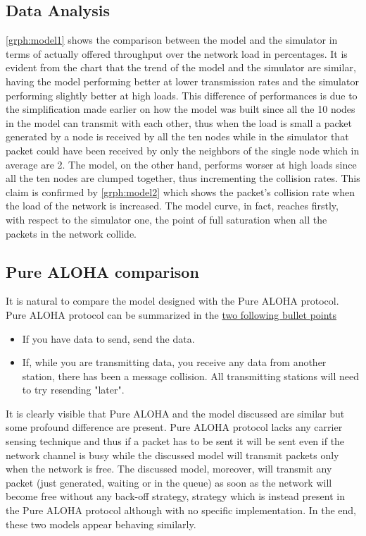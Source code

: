 \documentclass[conference]{IEEEtran}
\begin{document}
\subsection{Data Analysis}\label{sec:dataanalysismodel}
\cref{grph:model1} shows the comparison between the model and the simulator in terms of actually offered throughput over the network load in percentages. It is evident from the chart that the trend of the model and the simulator are similar, having the model performing better at lower transmission rates and the simulator performing slightly better at high loads. This difference of performances is due to the simplification made earlier on how the model was built since all the 10 nodes in the model can transmit with each other, thus when the load is small a packet generated by a node is received by all the ten nodes while in the simulator that packet could have been received by only the neighbors of the single node which in average are 2. The model, on the other hand, performs worser at high loads since all the ten nodes are clumped together, thus incrementing the collision rates. This claim is confirmed by \cref{grph:model2} which shows the packet's collision rate when the load of the network is increased. The model curve, in fact, reaches firstly, with respect to the simulator one, the point of full saturation when all the packets in the network collide. 

\subsection{Pure ALOHA comparison}\label{sec:purealohacomparison}
It is natural to compare the model designed with the Pure ALOHA protocol. Pure ALOHA protocol can be summarized in the \href{https://en.wikipedia.org/wiki/ALOHAnet#Pure_ALOHA}{two following bullet points}
\begin{itemize}
\item If you have data to send, send the data.
\item If, while you are transmitting data, you receive any data from another station, there has been a message collision. All transmitting stations will need to try resending "later".
\end{itemize}
It is clearly visible that Pure ALOHA and the model discussed are similar but some profound difference are present. Pure ALOHA protocol lacks any carrier sensing technique and thus if a packet has to be sent it will be sent even if the network channel is busy while the discussed model will transmit packets only when the network is free. The discussed model, moreover, will transmit any packet (just generated, waiting or in the queue) as soon as the network will become free without any back-off strategy, strategy which is instead present in the Pure ALOHA protocol although with no specific implementation. In the end, these two models appear behaving similarly.
\end{document}
